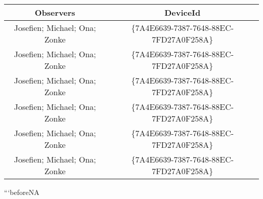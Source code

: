 \documentclass[
]{article}
\begin{document}
\begin{longtable}[]{@{}cc@{}}
\toprule
Observers & DeviceId \\
\midrule
\endhead
Josefien; Michael; Ona; Zonke &
\{7A4E6639-7387-7648-88EC-7FD27A0F258A\} \\
Josefien; Michael; Ona; Zonke &
\{7A4E6639-7387-7648-88EC-7FD27A0F258A\} \\
Josefien; Michael; Ona; Zonke &
\{7A4E6639-7387-7648-88EC-7FD27A0F258A\} \\
Josefien; Michael; Ona; Zonke &
\{7A4E6639-7387-7648-88EC-7FD27A0F258A\} \\
Josefien; Michael; Ona; Zonke &
\{7A4E6639-7387-7648-88EC-7FD27A0F258A\} \\
Josefien; Michael; Ona; Zonke &
\{7A4E6639-7387-7648-88EC-7FD27A0F258A\} \\
\bottomrule
\end{longtable}

```beforeNA
\end{document}
